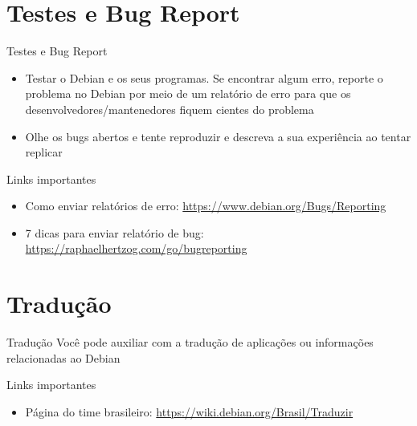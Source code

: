 \documentclass[10pt, compress, aspectratio=169]{beamer}
\begin{document}
\section{Testes e Bug Report}

\begin{frame}{Testes e Bug Report}
  \begin{itemize}
    \item Testar o Debian e os seus programas. Se encontrar algum erro, reporte
          o problema no Debian por meio de um relatório de erro para que os
          desenvolvedores/mantenedores fiquem cientes do problema
    \item Olhe os bugs abertos e tente reproduzir e descreva a sua experiência
          ao tentar replicar
  \end{itemize}

  \begin{exampleblock}{Links importantes}
    \begin{itemize}
      \item Como enviar relatórios de erro:  \url{https://www.debian.org/Bugs/Reporting}
      \item 7 dicas para enviar relatório de bug: \url{https://raphaelhertzog.com/go/bugreporting}
    \end{itemize}
  \end{exampleblock}

\end{frame}

\section{Tradução}

\begin{frame}{Tradução}
  Você pode auxiliar com a tradução de aplicações ou informações relacionadas
  ao Debian

  \begin{exampleblock}{Links importantes}
    \begin{itemize}
      \item Página do time brasileiro: \url{https://wiki.debian.org/Brasil/Traduzir}
    \end{itemize}
  \end{exampleblock}

\end{frame}
\end{document}

